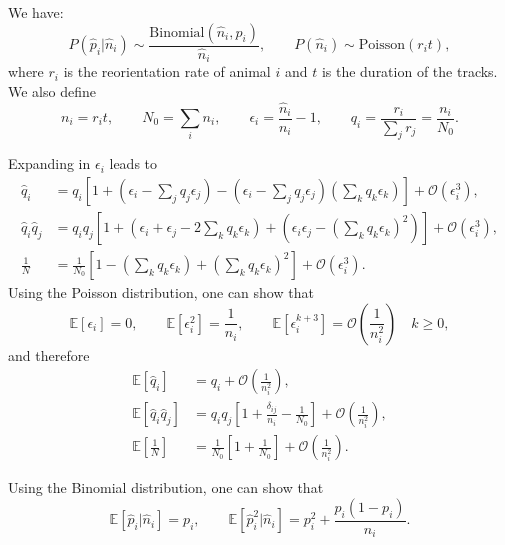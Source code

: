 \documentclass[12pt]{article}
\newcommand{\E}{\mathbb{E}}
\newcommand{\CO}{\mathcal{O}}
\newcommand{\prn}[1]{\left ( #1 \right )}
\newcommand{\brk}[1]{\left [ #1 \right ]}
\begin{document}
We have:
%
\begin{equation}\label{eq:estdist}
  P(\hat{p}_i|\hat{n}_i) \sim \frac{\mathrm{Binomial}(\hat{n}_i,p_i)}{\hat{n}_i},
  \qquad
  P(\hat{n}_i) \sim \mathrm{Poisson}(r_it),
\end{equation}
%
where $r_i$ is the reorientation rate of animal $i$ and $t$ is the duration of the tracks. We also define
%
\begin{equation}\label{eq:biasnot}
  n_i = r_it, \qquad
  N_0 = \sum_i n_i, \qquad
  \epsilon_i = \frac{\hat{n}_i}{n_i}-1, \qquad
  q_i = \frac{r_i}{\sum_j r_j} = \frac{n_i}{N_0}.
\end{equation}
%

Expanding in $\epsilon_i$ leads to
%
\begin{equation}\label{eq:expandeps}
  \begin{aligned}
    \hat{q}_i &= q_i\brk{ 1 + \prn{\epsilon_i-\sum_jq_j\epsilon_j} -  \prn{\epsilon_i-\sum_jq_j\epsilon_j} \prn{\sum_kq_k\epsilon_k} } +\CO\prn{\epsilon_i^3}, \\
    \hat{q}_i\hat{q}_j &= q_iq_j\brk{ 1 + \prn{\epsilon_i+\epsilon_j-2\sum_kq_k\epsilon_k} +  \prn{\epsilon_i\epsilon_j-(\sum_kq_k\epsilon_k)^2} }  +\CO\prn{\epsilon_i^3}, \\
    \frac{1}{N} &= \frac{1}{N_0} \brk{ 1 - \prn{\sum_kq_k\epsilon_k} +  \prn{\sum_kq_k\epsilon_k}^2 } +\CO\prn{\epsilon_i^3}.
  \end{aligned}
\end{equation}
%
Using the Poisson distribution, one can show that
%
\begin{equation}\label{eq:expeps}
    \E\brk{\epsilon_i} = 0, \qquad
    \E\brk{\epsilon_i^2} = \frac{1}{n_i}, \qquad
    \E\brk{\epsilon_i^{k+3}} = \CO\prn{\frac{1}{n_i^2}} \quad k\geq0,
\end{equation}
%
and therefore
%
\begin{equation}\label{eq:expandepsex}
  \begin{aligned}
    \E\brk{\hat{q}_i} &= q_i + \CO\prn{\frac{1}{n_i^2}}, \\
    \E\brk{\hat{q}_i\hat{q}_j} &= q_iq_j\brk{ 1 + \frac{\delta_{ij}}{n_i} -  \frac{1}{N_0}}  + \CO\prn{\frac{1}{n_i^2}}, \\
    \E\brk{\frac{1}{N}} &= \frac{1}{N_0} \brk{ 1  +  \frac{1}{N_0} } + \CO\prn{\frac{1}{n_i^2}}.
  \end{aligned}
\end{equation}
%

Using the Binomial distribution, one can show that
%
\begin{equation}\label{eq:expi}
  \E\brk{\hat{p}_i|\hat{n}_i} = p_i, \qquad
  \E\brk{\hat{p}_i^2|\hat{n}_i} = p_i^2 + \frac{p_i(1-p_i)}{n_i}.
\end{equation}
%
\end{document}
